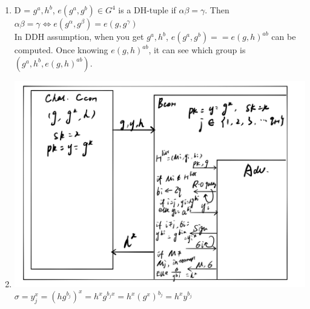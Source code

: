 \documentclass[11pt]{article}
\begin{document}
\begin{enumerate}
\begin{enumerate}
    \item D = $g^{a}, h^{b}$, $e(g^{a},g^{b}) \in G^{4}$ is a DH-tuple if $\alpha\beta = \gamma$. Then $\alpha\beta = \gamma \Leftrightarrow e(g^{\alpha},g^{\beta}) = e(g,g^{\gamma})$\\
          In DDH assumption, when you get $g^{a}, h^{b}$, $e(g^{a},g^{b}) == e(g,h)^{ab}$ can be computed. Once knowing $e(g,h)^{ab}$, it can see which group is $(g^{a},h^{b},e(g,h)^{ab})$.
    \item \includegraphics[scale=0.3]{S4.jpeg}\\
          $\sigma = y^{x}_j = (hg^{b_j})^{x} = h^{x}g^{b_jx} = h^{x}(g^{x})^{b_j} = h^{x}y^{b_j}$
\end{enumerate}


\end{enumerate}
\end{document}
